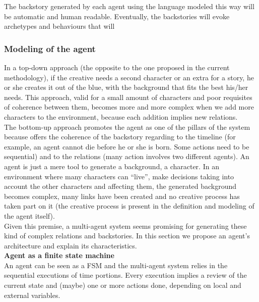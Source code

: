 \documentclass{sig-alternate}
\begin{document}
The backstory generated by each agent using the language modeled this way will be automatic and human readable. Eventually, the backstories will evoke archetypes and behaviours that will  



\subsubsection{Modeling of the agent}


In a top-down approach (the opposite to the one proposed in the current methodology), if the creative needs a second character or an extra for a story, he or she creates it out of the blue, with the background that fits the best his/her needs. This approach, valid for a small amount of characters and poor requisites of coherence between them, becomes more and more complex when we add more characters to the environment, because each addition implies new relations.
\\

The bottom-up approach promotes the agent as one of the pillars of the system because offers the coherence of the backstory regarding to the timeline (for example, an agent cannot die before he or she is born. Some actions need to be sequential) and to the relations (many action involves two different agents). An agent is just a mere tool to generate a background, a character. In an environment where many characters can ``live'', make decisions taking into account the other characters and affecting them, the generated background becomes complex, many links have been created and no creative process has taken part on it (the creative process is present in the definition and modeling of the agent itself).\\

Given this premise, a multi-agent system seems promising for generating these kind of complex relations and backstories. In this section we propose an agent's architecture and explain its characteristics.\\

\textbf{Agent as a finite state machine}\\


An agent can be seen as a FSM and the multi-agent system relies in the sequential executions of time portions. Every execution implies a review of the current state and (maybe) one or more actions done, depending on local and external variables.\\
\end{document}
